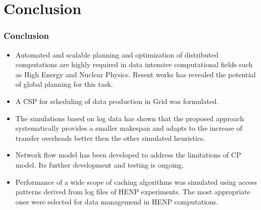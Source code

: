 \documentclass{beamer}
\begin{document}
\section{Conclusion}
\begin{frame}\frametitle{Conclusion}
\begin{block}{}
\begin{itemize}
\item Automated and scalable planning and optimization of distributed computations are highly required in data intensive computational fields such as High Energy and Nuclear Physics. Resent works has revealed the potential of global planning for this task.
\item A CSP for scheduling of data production in Grid was formulated. 
\item The simulations based on log data has shown that the proposed approach systematically provides a smaller makespan and adapts to the increase of transfer overheads better then the other simulated  heuristics.
\item Network flow model has been developed to address the limitations of CP model. Its further development and testing is ongoing.
\item Performance of a wide scope of caching algorithms was simulated using access patterns derived from log files of HENP experiments. The most appropriate ones were selected for data managemend in HENP computations.     

\end{itemize}
\end{block}
\end{frame}
\end{document}

